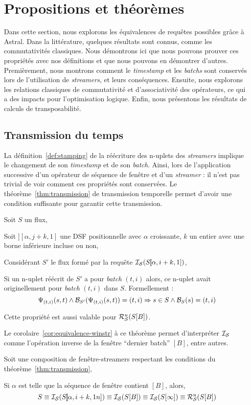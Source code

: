 \section{Propositions et théorèmes}\label{sec:valid:expressivite:theoremes}
Dans cette section, nous explorons les équivalences de requêtes possibles grâce à Astral. Dans la littérature, quelques résultats sont connus, comme les commutativités classiques. Nous démontrons ici que nous pouvons prouver ces propriétés avec nos définitions et que nous pouvons en démontrer d'autres. Premièrement, nous montrons comment le \textit{timestamp} et les \textit{batchs} sont conservés lors de l'utilisation de \textit{streamers}, et leurs conséquences. Ensuite, nous explorons les relations classiques de commutativité et d'associativité des opérateurs, ce qui a des impacts pour l'optimisation logique. Enfin, nous présentons les résultats de calculs de transposabilité.

\subsection{Transmission du temps}
La définition~\ref{def:stamping} de la réécriture des n-uplets des \textit{streamers} implique le changement de son \textit{timestamp} et de son \textit{batch}. Ainsi, lors de l'application successive d'un opérateur de séquence de fenêtre et d'un \textit{streamer} : il n'est pas trivial de voir comment ces propriétés sont conservées. Le théorème~\ref{thm:transmission} de transmission temporelle permet d'avoir une condition suffisante pour garantir cette transmission.

\begin{thm}\label{thm:transmission}
    Soit $S$ un flux,

    Soit $]\!\![\alpha,j+k,1]$ une DSF positionnelle avec $\alpha$ croissante, $k$ un entier avec une borne inférieure incluse ou non,

    Considérant $S'$ le flux formé par la requête $\mathcal{I_S}(S]\!\![\alpha,i+k,1])$,

    Si un n-uplet réécrit de $S'$ a pour \textit{batch} $(t,i)$ alors, ce n-uplet avait originellement pour \textit{batch} $(t,i)$ dans $S$. Formellement :
$$\Psi_{(t,i)}(s,t) \wedge \mathcal{B}_{S'}(\Psi_{(t,i)}(s,t)) = (t,i) \Rightarrow s\in S \wedge \mathcal{B}_S(s) = (t,i)$$

    Cette propriété est aussi valable pour $\mathcal{R}_{\mathcal S}^{u}(S[B])$.
\end{thm}

Le corolaire~\ref{cor:equivalence-winstr} à ce théorème permet d'interpréter $\mathcal{I_S}$ comme l'opération inverse de la fenêtre \enquote{dernier batch} $[B]$, entre autres.
\begin{coro}\label{cor:equivalence-winstr}
    Soit une composition de fenêtre-streamers respectant les conditions du théorème~\ref{thm:transmission},

    Si $\alpha$ est telle que la séquence de fenêtre contient $[B]$, alors,
$$S \equiv \mathcal{I_S}(S]\!\![\alpha,i+k,1n]) \equiv \mathcal{I_S}(S[B]) \equiv \mathcal{I_S}(S[\infty]) \equiv \mathcal{R}_{\mathcal S}^{u}(S[B])$$
\end{coro}

